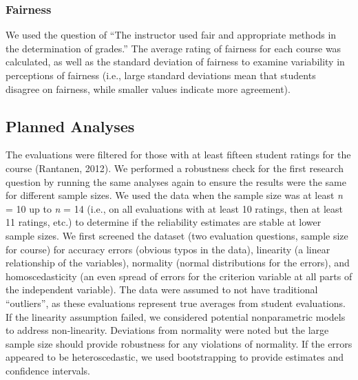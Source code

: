 \documentclass[
  man,mask]{apa7}
\begin{document}
\subsubsection{Fairness}\label{fairness}

We used the question of ``The instructor used fair and appropriate methods in the determination of grades.'' The average rating of fairness for each course was calculated, as well as the standard deviation of fairness to examine variability in perceptions of fairness (i.e., large standard deviations mean that students disagree on fairness, while smaller values indicate more agreement).

\subsection{Planned Analyses}\label{planned-analyses}

The evaluations were filtered for those with at least fifteen student
ratings for the course (Rantanen, 2012). We performed a robustness check
for the first research question by running the same analyses again to
ensure the results were the same for different sample sizes. We used the
data when the sample size was at least \emph{n} = 10 up to \emph{n} = 14 (i.e., on
all evaluations with at least 10 ratings, then at least 11 ratings,
etc.) to determine if the reliability estimates are stable at lower
sample sizes. We first screened the dataset (two evaluation questions,
sample size for course) for accuracy errors (obvious typos in the data),
linearity (a linear relationship of the variables), normality (normal
distributions for the errors), and homoscedasticity (an even spread of
errors for the criterion variable at all parts of the independent
variable). The data were assumed to not have traditional ``outliers'', as
these evaluations represent true averages from student evaluations. If
the linearity assumption failed, we considered potential nonparametric
models to address non-linearity. Deviations from normality were noted
but the large sample size should provide robustness for any violations
of normality. If the errors appeared to be heteroscedastic, we used
bootstrapping to provide estimates and confidence intervals.
\end{document}
